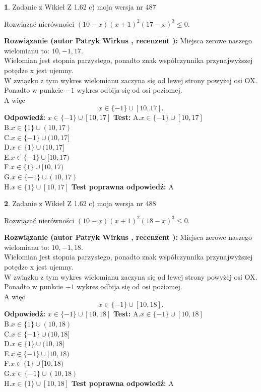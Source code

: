 \documentclass[12pt, a4paper]{article}
\theoremstyle{definition} %
\newtheorem{zad}{}
\newcommand{\zadStart}[1]{\begin{zad}#1\newline}
\newcommand{\zadStop}{\end{zad}}
\newcommand{\rozwStart}[2]{\noindent \textbf{Rozwiązanie (autor #1 , recenzent #2): }\newline}
\newcommand{\rozwStop}{\newline}
\newcommand{\odpStart}{\noindent \textbf{Odpowiedź:}\newline}
\newcommand{\odpStop}{\newline}
\newcommand{\testStart}{\noindent \textbf{Test:}\newline}
\newcommand{\testStop}{\newline}
\newcommand{\kluczStart}{\noindent \textbf{Test poprawna odpowiedź:}\newline}
\newcommand{\kluczStop}{\newline}
\begin{document}
\zadStart{Zadanie z Wikieł Z 1.62 c) moja wersja nr 487}

Rozwiązać nierówności $(10-x)(x+1)^{2}(17-x)^{3}\le0$.
\zadStop
\rozwStart{Patryk Wirkus}{}
Miejsca zerowe naszego wielomianu to: $10, -1, 17$.\\
Wielomian jest stopnia parzystego, ponadto znak współczynnika przy\linebreak najwyższej potędze x jest ujemny.\\ W związku z tym wykres wielomianu zaczyna się od lewej strony powyżej osi OX.\\
Ponadto w punkcie $-1$ wykres odbija się od osi poziomej.\\
A więc $$x \in \{-1\} \cup [10,17].$$
\rozwStop
\odpStart
$x \in \{-1\} \cup [10,17]$
\odpStop
\testStart
A.$x \in \{-1\} \cup [10,17]$\\
B.$x \in \{1\} \cup (10,17)$\\
C.$x \in \{-1\} \cup (10,17]$\\
D.$x \in \{1\} \cup (10,17]$\\
E.$x \in \{-1\} \cup [10,17)$\\
F.$x \in \{1\} \cup [10,17)$\\
G.$x \in \{-1\} \cup (10,17)$\\
H.$x \in \{1\} \cup [10,17]$
\testStop
\kluczStart
A
\kluczStop



\zadStart{Zadanie z Wikieł Z 1.62 c) moja wersja nr 488}

Rozwiązać nierówności $(10-x)(x+1)^{2}(18-x)^{3}\le0$.
\zadStop
\rozwStart{Patryk Wirkus}{}
Miejsca zerowe naszego wielomianu to: $10, -1, 18$.\\
Wielomian jest stopnia parzystego, ponadto znak współczynnika przy\linebreak najwyższej potędze x jest ujemny.\\ W związku z tym wykres wielomianu zaczyna się od lewej strony powyżej osi OX.\\
Ponadto w punkcie $-1$ wykres odbija się od osi poziomej.\\
A więc $$x \in \{-1\} \cup [10,18].$$
\rozwStop
\odpStart
$x \in \{-1\} \cup [10,18]$
\odpStop
\testStart
A.$x \in \{-1\} \cup [10,18]$\\
B.$x \in \{1\} \cup (10,18)$\\
C.$x \in \{-1\} \cup (10,18]$\\
D.$x \in \{1\} \cup (10,18]$\\
E.$x \in \{-1\} \cup [10,18)$\\
F.$x \in \{1\} \cup [10,18)$\\
G.$x \in \{-1\} \cup (10,18)$\\
H.$x \in \{1\} \cup [10,18]$
\testStop
\kluczStart
A
\kluczStop
\end{document}
